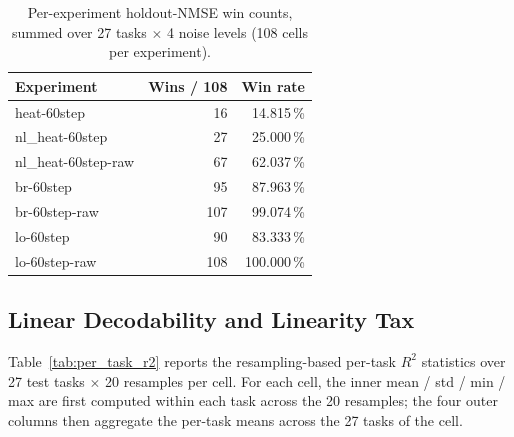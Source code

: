 \documentclass[10pt,journal,compsoc]{IEEEtran}
\begin{document}
\begin{table}[!t]
\centering
\caption{Per-experiment holdout-NMSE win counts, summed over 27 tasks
$\times$ 4 noise levels (108 cells per experiment).}
\label{tab:nmse_wins}
\scriptsize
\begin{tabular}{@{}lrr@{}}
\toprule
Experiment                    & Wins / 108 & Win rate \\
\midrule
heat-60step                   & 16  & 14.815\,\% \\
nl\_heat-60step               & 27  & 25.000\,\% \\
nl\_heat-60step-raw           & 67  & 62.037\,\% \\
br-60step                     & 95  & 87.963\,\% \\
br-60step-raw                 & 107 & 99.074\,\% \\
lo-60step                     & 90  & 83.333\,\% \\
lo-60step-raw                 & 108 & 100.000\,\% \\
\bottomrule
\end{tabular}
\end{table}

\subsection{Linear Decodability and Linearity Tax}\label{subsec:results_linearity_tax}

Table~\ref{tab:per_task_r2} reports the resampling-based per-task
$R^2$ statistics over 27 test tasks $\times$ 20 resamples per cell.
For each cell, the inner mean / std / min / max are first computed
within each task across the 20 resamples; the four outer columns then
aggregate the per-task means across the 27 tasks of the cell.
\end{document}
